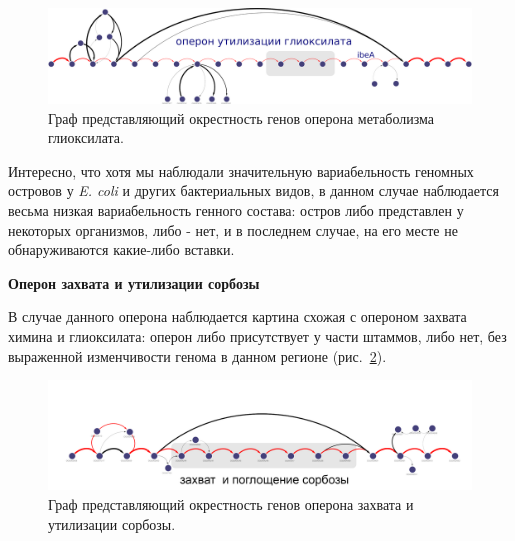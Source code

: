 \begin{figure}[!ht] 
  \center
    \includegraphics[width=\textwidth]{Dissertation/images/subgraphs/glyoxilate_metabolism_operon_crop.png}
  \caption{Граф представляющий окрестность генов оперона метаболизма глиоксилата. }
  \label{img:glioxilate} 
\end{figure}


Интересно, что хотя мы наблюдали значительную вариабельность геномных островов у \textit{E. coli} и других бактериальных видов, в данном случае наблюдается весьма низкая вариабельность генного состава: остров либо представлен у некоторых организмов, либо - нет, и в последнем случае, на его месте не обнаруживаются какие-либо вставки.

\textbf{Оперон захвата и утилизации сорбозы}

В случае данного оперона наблюдается картина схожая с опероном захвата химина и глиоксилата: оперон либо присутствует у части штаммов, либо нет, без выраженной изменчивости генома в данном регионе (рис.~\ref{img:sorbitol}). 

\begin{figure}[!ht] 
	\center
	\includegraphics[width=\textwidth]{Dissertation/images/subgraphs/sorbitol.png}
	\caption{Граф представляющий окрестность генов оперона захвата и утилизации сорбозы. }
	\label{img:sorbitol} 
\end{figure}

